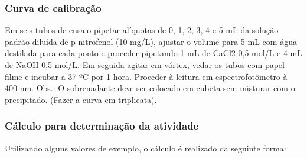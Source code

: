 \subsubsection{Curva de calibração}
Em seis tubos de ensaio pipetar alíquotas de 0, 1, 2, 3, 4 e 5 mL da solução padrão diluída de p-nitrofenol (10 mg/L), ajustar o volume para 5 mL com água destilada para cada ponto e proceder pipetando 1 mL de CaCl2 0,5 mol/L e 4 mL de NaOH 0,5 mol/L. Em seguida agitar em vórtex, vedar os tubos com papel filme e incubar a 37 ºC por 1 hora. Proceder à leitura em espectrofotômetro à 400 nm. Obs.: O sobrenadante deve ser colocado em cubeta sem misturar com o precipitado. (Fazer a curva em triplicata).

\subsubsection{Cálculo para determinação da atividade}
Utilizando alguns valores de exemplo, o cálculo é realizado da seguinte forma:

